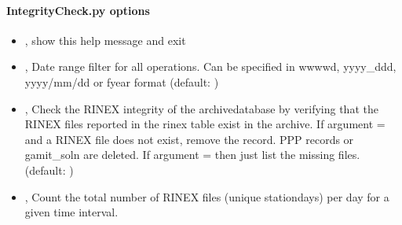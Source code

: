 \documentclass[letterpaper,10pt,english]{sphinxmanual}
\begin{document}
\paragraph{IntegrityCheck.py options}
\label{\detokenize{com:IntegrityCheck.py-options}}\begin{itemize}
\item {} 
\sphinxAtStartPar
{\hyperref[\detokenize{com:IntegrityCheck.py--h}]{}}, {\hyperref[\detokenize{com:IntegrityCheck.py---help}]{}} \sphinxhyphen{} show this help message and exit

\item {} 
\sphinxAtStartPar
{\hyperref[\detokenize{com:IntegrityCheck.py--d}]{}} , {\hyperref[\detokenize{com:IntegrityCheck.py---date_filter}]{}}  \sphinxhyphen{} Date range filter for all operations. Can be specified in wwww\sphinxhyphen{}d, yyyy\_ddd, yyyy/mm/dd or fyear format (default: )

\item {} 
\sphinxAtStartPar
{\hyperref[\detokenize{com:IntegrityCheck.py--rinex}]{}} , {\hyperref[\detokenize{com:IntegrityCheck.py---check_rinex}]{}}  \sphinxhyphen{} Check the RINEX integrity of the archive\sphinxhyphen{}database by verifying that the RINEX files reported in the rinex table exist in the archive. If argument =  and a RINEX file does not exist, remove the record. PPP records or gamit\_soln are deleted. If argument =  then just list the missing files. (default: )

\item {} 
\sphinxAtStartPar
{\hyperref[\detokenize{com:IntegrityCheck.py--rnx_count}]{}}, {\hyperref[\detokenize{com:IntegrityCheck.py---rinex_count}]{}} \sphinxhyphen{} Count the total number of RINEX files (unique station\sphinxhyphen{}days) per day for a given time interval.


\end{itemize}
\end{document}
